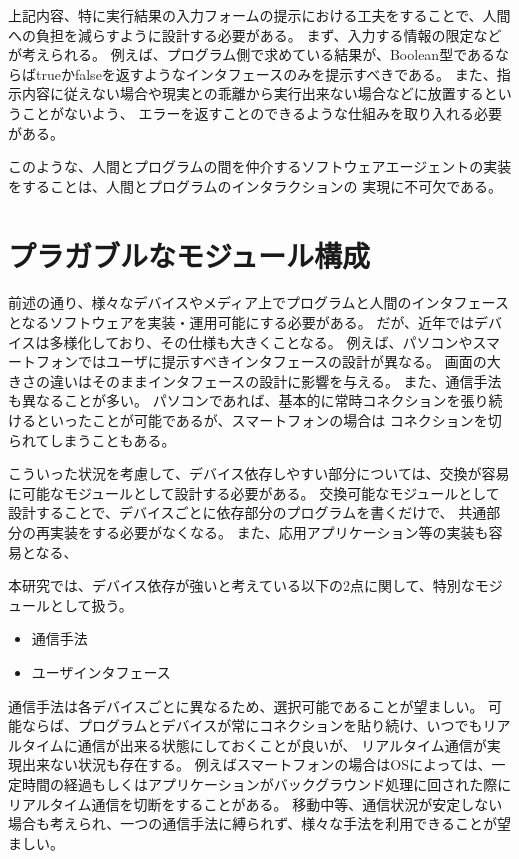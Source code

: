 上記内容、特に実行結果の入力フォームの提示における工夫をすることで、人間への負担を減らすように設計する必要がある。
まず、入力する情報の限定などが考えられる。
例えば、プログラム側で求めている結果が、Boolean型であるならばtrueかfalseを返すようなインタフェースのみを提示すべきである。
また、指示内容に従えない場合や現実との乖離から実行出来ない場合などに放置するということがないよう、
エラーを返すことのできるような仕組みを取り入れる必要がある。

このような、人間とプログラムの間を仲介するソフトウェアエージェントの実装をすることは、人間とプログラムのインタラクションの
実現に不可欠である。

\section{プラガブルなモジュール構成}\label{sec:plaggable-module-design}

前述の通り、様々なデバイスやメディア上でプログラムと人間のインタフェースとなるソフトウェアを実装・運用可能にする必要がある。
だが、近年ではデバイスは多様化しており、その仕様も大きくことなる。
例えば、パソコンやスマートフォンではユーザに提示すべきインタフェースの設計が異なる。
画面の大きさの違いはそのままインタフェースの設計に影響を与える。
また、通信手法も異なることが多い。
パソコンであれば、基本的に常時コネクションを張り続けるといったことが可能であるが、スマートフォンの場合は
コネクションを切られてしまうこともある。

こういった状況を考慮して、デバイス依存しやすい部分については、交換が容易に可能なモジュールとして設計する必要がある。
交換可能なモジュールとして設計することで、デバイスごとに依存部分のプログラムを書くだけで、
共通部分の再実装をする必要がなくなる。
また、応用アプリケーション等の実装も容易となる、

本研究では、デバイス依存が強いと考えている以下の2点に関して、特別なモジュールとして扱う。

\begin{itemize}
\itemsep1pt\parskip0pt
\item
  通信手法
\item
  ユーザインタフェース
\end{itemize}

通信手法は各デバイスごとに異なるため、選択可能であることが望ましい。
可能ならば、プログラムとデバイスが常にコネクションを貼り続け、いつでもリアルタイムに通信が出来る状態にしておくことが良いが、
リアルタイム通信が実現出来ない状況も存在する。
例えばスマートフォンの場合はOSによっては、一定時間の経過もしくはアプリケーションがバックグラウンド処理に回された際に
リアルタイム通信を切断をすることがある。
移動中等、通信状況が安定しない場合も考えられ、一つの通信手法に縛られず、様々な手法を利用できることが望ましい。

